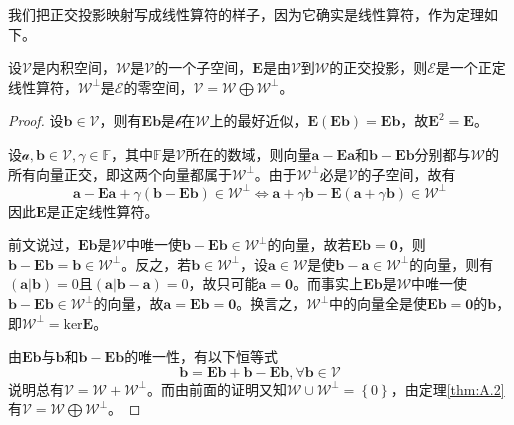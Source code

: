 \documentclass[main.tex]{subfiles}
\begin{document}
我们把正交投影映射写成线性算符的样子，因为它确实是线性算符，作为定理如下。
\begin{theorem}\label{thm:A.4}
    设$\mathcal{V}$是内积空间，$\mathcal{W}$是$\mathcal{V}$的一个子空间，$\mathbf{E}$是由$\mathcal{V}$到$\mathcal{W}$的正交投影，则$\mathcal{E}$是一个正定线性算符，$\mathcal{W}^\perp$是$\mathcal{E}$的零空间，$\mathcal{V}=\mathcal{W}\bigoplus\mathcal{W}^\perp$。
\end{theorem}
\begin{proof}
    设$\mathbf{b}\in\mathcal{V}$，则有$\mathbf{Eb}$是$\mathcal{b}$在$\mathcal{W}$上的最好近似，$\mathbf{E}\left(\mathbf{Eb}\right)=\mathbf{Eb}$，故$\mathbf{E}^2=\mathbf{E}$。

    设$\mathcal{a},\mathbf{b}\in\mathcal{V},\gamma\in\mathbb{F}$，其中$\mathbb{F}$是$\mathcal{V}$所在的数域，则向量$\mathbf{a}-\mathbf{Ea}$和$\mathbf{b}-\mathbf{Eb}$分别都与$\mathcal{W}$的所有向量正交，即这两个向量都属于$\mathcal{W}^\perp$。由于$\mathcal{W}^\perp$必是$\mathcal{V}$的子空间，故有
    \[
        \mathbf{a}-\mathbf{Ea}+\gamma\left(\mathbf{b}-\mathbf{Eb}\right)\in\mathcal{W}^\perp\Leftrightarrow\mathbf{a}+\gamma\mathbf{b}-\mathbf{E}\left(\mathbf{a}+\gamma\mathbf{b}\right)\in\mathcal{W}^\perp
    \]
    因此$\mathbf{E}$是正定线性算符。

    前文说过，$\mathbf{Eb}$是$\mathcal{W}$中唯一使$\mathbf{b}-\mathbf{Eb}\in\mathcal{W}^\perp$的向量，故若$\mathbf{Eb}=\mathbf{0}$，则$\mathbf{b}-\mathbf{Eb}=\mathbf{b}\in\mathcal{W}^\perp$。反之，若$\mathbf{b}\in\mathcal{W}^\perp$，设$\mathbf{a}\in\mathcal{W}$是使$\mathbf{b}-\mathbf{a}\in\mathcal{W}^\perp$的向量，则有$\left(\mathbf{a}|\mathbf{b}\right)=0$且$\left(\mathbf{a}|\mathbf{b}-\mathbf{a}\right)=0$，故只可能$\mathbf{a}=\mathbf{0}$。而事实上$\mathbf{Eb}$是$\mathcal{W}$中唯一使$\mathbf{b}-\mathbf{Eb}\in\mathcal{W}^\perp$的向量，故$\mathbf{a}=\mathbf{Eb}=\mathbf{0}$。换言之，$\mathcal{W}^\perp$中的向量全是使$\mathbf{Eb}=\mathbf{0}$的$\mathbf{b}$，即$\mathcal{W}^\perp=\mathrm{ker}\mathbf{E}$。


    由$\mathbf{Eb}$与$\mathbf{b}$和$\mathbf{b}-\mathbf{Eb}$的唯一性，有以下恒等式
    \[\mathbf{b}=\mathbf{Eb}+\mathbf{b}-\mathbf{Eb}, \forall\mathbf{b}\in\mathcal{V}\]
    说明总有$\mathcal{V}=\mathcal{W}+\mathcal{W}^\perp$。而由前面的证明又知$\mathcal{W}\cup\mathcal{W}^\perp=\left\{0\right\}$，由定理\ref{thm:A.2}有$\mathcal{V}=\mathcal{W}\bigoplus\mathcal{W}^\perp$。
\end{proof}
\end{document}
